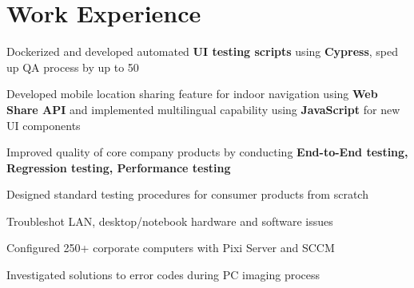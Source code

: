 \documentclass[]{morris-resume-openfont}
\begin{document}
%
%


%
%

%
%

\begin{minipage}[t]{0.49\textwidth} 


\section{Work Experience}
\vspace{\topsep} %
\begin{tightemize}
\item Dockerized and developed automated \textbf{UI testing scripts} using \textbf{Cypress}, sped up QA process by up to 50
\item Developed mobile location sharing feature for indoor navigation using \textbf{Web Share API} and implemented multilingual capability using \textbf{JavaScript} for new UI components 
\item Improved quality of core company products by conducting \textbf{End-to-End testing, Regression testing, Performance testing}
\item Designed standard testing procedures for consumer products from scratch
\end{tightemize}
\sectionsep

\begin{tightemize}
\item Troubleshot LAN, desktop/notebook hardware and software issues
\item Configured 250+ corporate computers with Pixi Server and SCCM  
\item Investigated solutions to error codes during PC imaging process 
\end{tightemize}
\sectionsep


\end{minipage}
\end{document}

